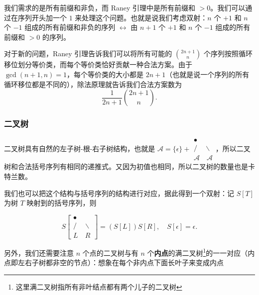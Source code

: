     我们需求的是所有前缀和非负，而 Raney 引理中是所有前缀和 $>0$。我们可以通过在序列开头加一个 $1$ 来处理这个问题。也就是说我们考虑双射：$n$ 个 $+1$ 和 $n$ 个 $-1$ 组成的所有前缀和非负的序列 $\leftrightarrow$ 由 $n+1$ 个 $+1$ 和 $n$ 个 $-1$ 组成的所有前缀和 $>0$ 的序列。

    对于新的问题，Raney 引理告诉我们可以将所有可能的 $\binom{2n+1}{n}$ 个序列按照循环移位划分等价类，而每个等价类恰好贡献一种合法方案。由于 $\gcd(n+1,n)=1$，每个等价类的大小都是 $2n+1$（也就是说一个序列的所有循环移位都是不同的），除法原理就告诉我们合法方案数为
    $$
    \frac{1}{2n+1}\binom{2n+1}{n}.
    $$

\subsubsection{二叉树}
    二叉树具有自然的左子树-根-右子树结构，也就是 $
\mathcal A=\{\epsilon\}+\begin{array}{c}
\bullet \\
/ \quad \backslash \\
\mathcal A \quad \mathcal A
\end{array}
$，所以二叉树和合法括号序列有相同的递推式。又因为初值也相同，所以二叉树的数量也是卡特兰数。

我们也可以把这个结构与括号序列的结构进行对应，据此得到一个双射：记 $S[T]$ 为树 $T$ 映射到的括号序列，则

$$
S\left[\begin{array}{c}
    \bullet \\
    / \quad \backslash \\
    L \quad R
    \end{array}\right]=(S[L])S[R],\quad S[\epsilon]=\epsilon.
$$

另外，我们还需要注意 $n$ 个点的二叉树与有 $n$ 个\textbf{内点}的满二叉树\footnote{这里满二叉树指所有非叶结点都有两个儿子的二叉树}的一一对应（内点即左右子树都非空的节点）：想象在每个非内点下面长叶子来变成内点

